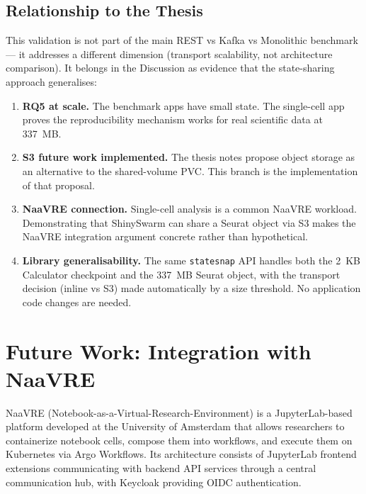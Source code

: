 \documentclass[11pt,a4paper]{article}
\begin{document}
\subsection{Relationship to the Thesis}

This validation is not part of the main REST vs Kafka vs Monolithic benchmark
--- it addresses a different dimension (transport scalability, not architecture
comparison). It belongs in the Discussion as evidence that the state-sharing
approach generalises:

\begin{enumerate}[nosep]
  \item \textbf{RQ5 at scale.} The benchmark apps have small state. The
        single-cell app proves the reproducibility mechanism works for real
        scientific data at 337~MB.
  \item \textbf{S3 future work implemented.} The thesis notes propose object
        storage as an alternative to the shared-volume PVC. This branch is the
        implementation of that proposal.
  \item \textbf{NaaVRE connection.} Single-cell analysis is a common NaaVRE
        workload. Demonstrating that ShinySwarm can share a Seurat object via S3
        makes the NaaVRE integration argument concrete rather than hypothetical.
  \item \textbf{Library generalisability.} The same \texttt{statesnap} API
        handles both the 2~KB Calculator checkpoint and the 337~MB Seurat
        object, with the transport decision (inline vs S3) made automatically
        by a size threshold. No application code changes are needed.
\end{enumerate}

\section{Future Work: Integration with NaaVRE}

NaaVRE (Notebook-as-a-Virtual-Research-Environment) is a JupyterLab-based
platform developed at the University of Amsterdam that allows researchers
to containerize notebook cells, compose them into workflows, and execute
them on Kubernetes via Argo Workflows. Its architecture consists of
JupyterLab frontend extensions communicating with backend API services
through a central communication hub, with Keycloak providing OIDC
authentication.
\end{document}
